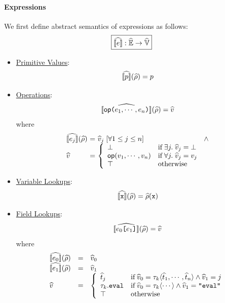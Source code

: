 \paragraph{Expressions} We first define abstract semantics of expressions as
follows:
\[
  \framebox{$\asem{\expr}: \aenvset \rightarrow \avalset$}
\]
\begin{itemize}
  \item \underline{Primitive Values}:
    \[
      \widehat{\llbracket{p}\rrbracket}(\widehat{\rho}) = p
    \]
  \item \underline{Operations}:
    \[
      \widehat{\llbracket{\textsf{op}\texttt{(}e_1, \cdots, e_n \texttt{)}}\rrbracket}(\widehat{\rho}) = \widehat{v}
    \]
    where
    \[
      \begin{array}{l@{~}c@{~}l@{~}l}
        \asem{\expr_j}(\aenv) &=& \aval_j \; [\forall 1 \leq j \leq n]
        &\wedge\\
        \aval &=& \left\{
          \begin{array}{ll}
            \bot & \text{if} \; \exists j. \; \aval_j = \bot\\

            \op(\val_1, \cdots, \val_n) &
            \text{if} \; \forall j. \; \aval_j = \val_j\\

            \top & \text{otherwise}\\
          \end{array}
        \right.\\
      \end{array}
    \]
  \item \underline{Variable Lookups}:
    \[
      \widehat{\llbracket{\texttt{x}}\rrbracket}(\widehat{\rho}) = \widehat{\rho}(\texttt{x})
    \]
  \item \underline{Field Lookups}:
    \[
      \widehat{\llbracket{e_0 \texttt{[}e_1 \texttt{]}}\rrbracket}(\widehat{\rho}) = \widehat{v}
    \]
    where
    \[
      \begin{array}{lcl}
        \widehat{\llbracket{e_0}\rrbracket}(\widehat{\rho}) &=& \widehat{v}_0\\
        \widehat{\llbracket{e_1}\rrbracket}(\widehat{\rho}) &=& \widehat{v}_1\\
        \widehat{v} &=& \left\{
          \begin{array}{ll}
            \widehat{t}_j & \text{if} \;
            \widehat{v}_0 = \tau_k \langle \widehat{t}_1, \cdots, \widehat{t}_n \rangle \wedge
            \widehat{v}_1 = j\\

            \tau_k.\texttt{eval} & \text{if} \;
            \widehat{v}_0 = \tau_k \langle \cdots \rangle \wedge
            \widehat{v}_1 = \texttt{"eval"}\\

            \top & \text{otherwise}\\
          \end{array}
        \right.\\
      \end{array}
    \]
\end{itemize}

